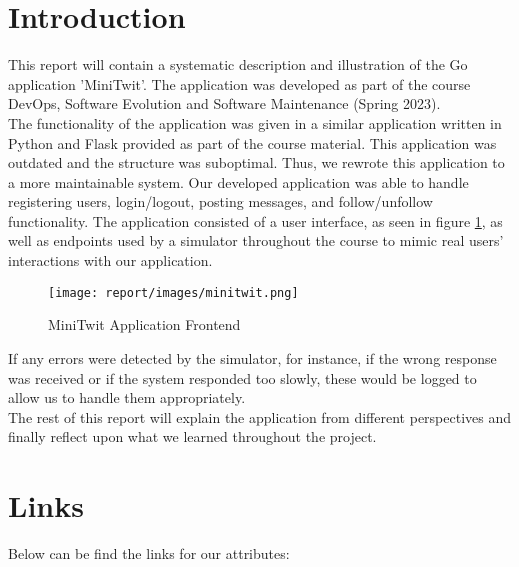 \section{Introduction}
This report will contain a systematic description and illustration of the Go application 
'MiniTwit'. The application was developed as part of the course 
DevOps, Software Evolution and Software Maintenance (Spring 2023). \\

The functionality of the application was
given in a similar application written in Python and Flask provided as part of the course material. This
application was outdated and the structure was suboptimal. Thus, we rewrote this application to a more 
maintainable system. Our developed application was able to handle registering users, login/logout, 
posting messages, and follow/unfollow functionality. The application consisted of a user interface, 
as seen in figure \ref{fig:minitwit_app}, as well as endpoints used by a simulator throughout the course to 
mimic real users' interactions with our application.

\begin{figure}[H]
    \centering
    \captionsetup{justification=centering,margin=1cm}
    \texttt{[image: report/images/minitwit.png]}
    \caption{MiniTwit Application Frontend}
    \label{fig:minitwit_app}
\end{figure}

If any errors were detected by the simulator, for instance, if the wrong response was received or if the system
responded too slowly, these would be logged to allow us to handle them appropriately.\\

The rest of this report will explain the application from different perspectives and finally reflect upon
what we learned throughout the project.

\section{Links}
Below can be find the links for our attributes:
